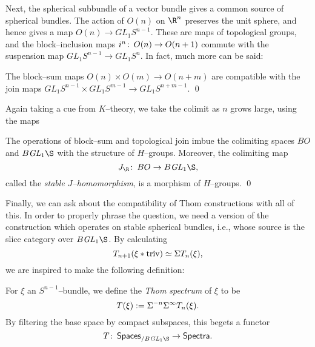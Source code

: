 Next, the spherical subbundle of a vector bundle gives a common source of spherical bundles.  The action of $O(n)$ on $\R^n$ preserves the unit sphere, and hence gives a map $O(n) \to GL_1 S^{n-1}$.  These are maps of topological groups, and the block--inclusion maps $i^n\colon\thinspace O(n) \to O(n+1)$ commute with the suspension map $GL_1 S^{n-1} \to GL_1 S^n$.  In fact, much more can be said:
\begin{lemma}\label{JIsMonoidal}
The block--sum maps $O(n) \times O(m) \to O(n+m)$ are compatible with the join maps $GL_1 S^{n-1} \times GL_1 S^{m-1} \to GL_1 S^{n+m-1}$. \qed
\end{lemma}
\noindent Again taking a cue from $K$--theory, we take the colimit as $n$ grows large, using the maps
\begin{center}
\end{center}
\begin{corollary}
The operations of block--sum and topological join imbue the colimiting spaces $BO$ and $B\GL_1 \S$ with the structure of $H$--groups.  Moreover, the colimiting map \[J_{\R}\co BO \to B\GL_1 \S,\] called the \textit{stable $J$--homomorphism}, is a morphism of $H$--groups. \qed
\end{corollary}
\noindent Finally, we can ask about the compatibility of Thom constructions with all of this.  In order to properly phrase the question, we need a version of the construction which operates on stable spherical bundles, i.e., whose source is the slice category over $B\GL_1 \S$.  By calculating \[T_{n+1}(\xi \ast \text{triv}) \simeq \Sigma T_n(\xi),\] we are inspired to make the following definition:

\begin{definition}
For $\xi$ an $S^{n-1}$--bundle, we define the \textit{Thom spectrum} of $\xi$ to be \[T(\xi) := \Sigma^{-n} \Sigma^\infty T_n(\xi).\]  By filtering the base space by compact subspaces, this begets a functor \[T\co \CatOf{Spaces}_{/ B\GL_1 \S} \to \CatOf{Spectra}.\]
\end{definition}

